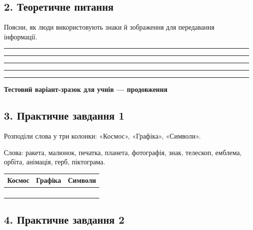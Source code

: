 \documentclass[11pt,a4paper]{article}
\begin{document}
\subsection*{2. Теоретичне питання}

Поясни, як люди використовують знаки й зображення для передавання інформації.\par

\rule{0.96\linewidth}{0.4pt}\par

\rule{0.96\linewidth}{0.4pt}\par

\rule{0.96\linewidth}{0.4pt}\par

\rule{0.96\linewidth}{0.4pt}\par

\rule{0.96\linewidth}{0.4pt}\par

\newpage\textbf{Тестовий варіант-зразок для учнів — продовження}\par

\subsection*{3. Практичне завдання 1}

Розподіли слова у три колонки: «Космос», «Графіка», «Символи».\par

Слова: ракета, малюнок, печатка, планета, фотографія, знак, телескоп, емблема, орбіта, анімація, герб, піктограма.\par

\begin{tabularx}{\linewidth}{|>{\raggedright\arraybackslash}X|>{\raggedright\arraybackslash}X|>{\raggedright\arraybackslash}X|}\hline

\textbf{Космос} & \textbf{Графіка} & \textbf{Символи} \\ \hline

 &  &  \\ \hline

 &  &  \\ \hline

 &  &  \\ \hline

 &  &  \\ \hline

\end{tabularx}\par

\subsection*{4. Практичне завдання 2}
\end{document}
